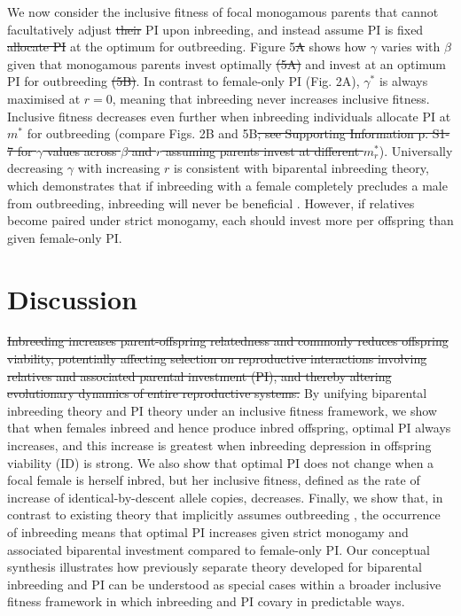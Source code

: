 \documentclass[12pt]{article}
\begin{document}
We now consider the inclusive fitness of focal monogamous parents that cannot {\color{blue}facultatively} adjust {\color{red}\st{their}} PI upon inbreeding, and instead {\color{blue}assume PI is fixed} {\color{red}\st{allocate PI}} at the optimum for outbreeding. Figure 5{\color{red}\st{A}} shows how $\gamma$ varies with $\beta$ given that monogamous parents invest optimally {\color{red}\st{(5A)}} and invest at an optimum PI for outbreeding {\color{red}\st{(5B)}}. In contrast to female-only PI (Fig. 2A), $\gamma^{*}$ is always maximised at $r=0$, meaning that inbreeding never increases inclusive fitness. Inclusive fitness decreases even further when inbreeding individuals allocate PI at $m^{*}$ for outbreeding (compare Figs. 2B and 5B{\color{red}\st{; see Supporting Information p. S1-7 for $\gamma$ values across $\beta$ and $r$ assuming parents invest at different $m^{*}_{r}$}}). Universally decreasing $\gamma$ with increasing $r$ is consistent with biparental inbreeding theory, which demonstrates that if inbreeding with a female completely precludes a male from outbreeding, inbreeding will never be beneficial \cite[][]{Waser1986, Duthie2015a}. However, if relatives become paired under strict monogamy, each should invest more per offspring than given female-only PI.

\section*{Discussion}

{\color{red}\st{Inbreeding increases parent-offspring relatedness and commonly reduces offspring viability, potentially affecting selection on reproductive interactions involving relatives and associated parental investment (PI), and thereby altering evolutionary dynamics of entire reproductive systems.}} By unifying biparental inbreeding theory and PI theory under an inclusive fitness framework, we show that when females inbreed and hence produce inbred offspring, optimal PI always increases, and this increase is greatest when inbreeding depression in offspring viability (ID) is strong. We also show that optimal PI does not change when a focal female is herself inbred, but her inclusive fitness, defined as the rate of increase of identical-by-descent allele copies, decreases. Finally, we show that, in contrast to existing theory that implicitly assumes outbreeding \cite[][]{Parker1985}, the occurrence of inbreeding means that optimal PI increases given strict monogamy and associated biparental investment compared to female-only PI. Our conceptual synthesis illustrates how previously separate theory developed for biparental inbreeding \cite[][]{Parker1979, Parker2006} and PI \cite[][]{Macnair1978, Parker1978} can be understood as special cases within a broader inclusive fitness framework in which inbreeding and PI covary in predictable ways.
\end{document}
